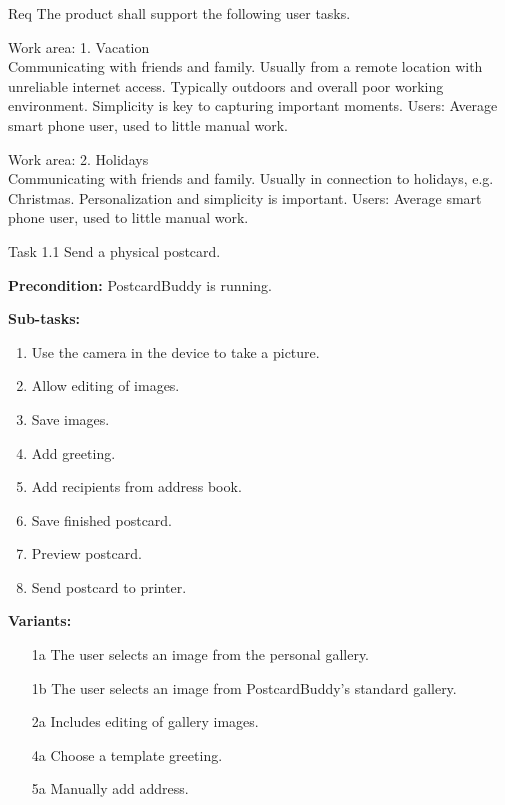 \documentclass[10pt,a4paper]{article}
\begin{document}
\begin {description}

\item [Req \thesubsubsection {.\thetasks}] The product shall support the following user tasks.

\item[Work area: 1. Vacation] \mbox{}\\
Communicating with friends and family. Usually from a remote location with unreliable internet access. Typically outdoors and overall poor working environment. Simplicity is key to capturing important moments. \newline
Users: Average smart phone user, used to little manual work. 

\item[Work area: 2. Holidays] \mbox{}\\
Communicating with friends and family. Usually in connection to holidays, e.g. Christmas. Personalization and simplicity is important.
 \newline
Users: Average smart phone user, used to little manual work.

\item [Task 1.1] Send a physical postcard.
\begin {description}
\item \textbf{Precondition:} PostcardBuddy is running.

\item \textbf{Sub-tasks:}
\begin{enumerate}
\item Use the camera in the device to take a picture.
\item Allow editing of images.
\item Save images.
\item Add greeting.
\item Add recipients from address book. 
\item Save finished postcard.
\item Preview postcard.
\item Send postcard to printer.
\end{enumerate}

\item \textbf{Variants:}
\begin{itemize}[label={}]
\item[1a] The user selects an image from the personal gallery.
\item[1b] The user selects an image from PostcardBuddy's standard gallery. 
\item[2a] Includes editing of gallery images.
\item[4a] Choose a template greeting.
\item[5a] Manually add address.
\end{itemize}
\end{description}


\end{description}
\end{document}
